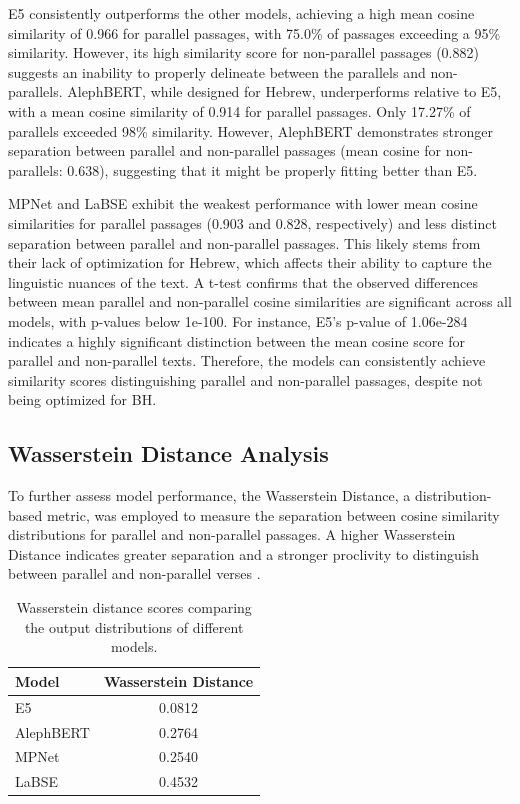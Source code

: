 \documentclass[12pt]{article}
\begin{document}
E5 consistently outperforms the other models, achieving a high mean cosine similarity of 0.966 for parallel passages, with 75.0\% of passages exceeding a 95\% similarity. However, its high similarity score for non-parallel passages (0.882) suggests an inability to properly delineate between the parallels and non-parallels. AlephBERT, while designed for Hebrew, underperforms relative to E5, with a mean cosine similarity of 0.914 for parallel passages. Only 17.27\% of parallels exceeded 98\% similarity. However, AlephBERT demonstrates stronger separation between parallel and non-parallel passages (mean cosine for non-parallels: 0.638), suggesting that it might be properly fitting better than E5.

MPNet and LaBSE exhibit the weakest performance with lower mean cosine similarities for parallel passages (0.903 and 0.828, respectively) and less distinct separation between parallel and non-parallel passages. This likely stems from their lack of optimization for Hebrew, which affects their ability to capture the linguistic nuances of the text.
A t-test confirms that the observed differences between mean parallel and non-parallel cosine similarities are significant across all models, with p-values below 1e-100. For instance, E5's p-value of 1.06e-284 indicates a highly significant distinction between the mean cosine score for parallel and non-parallel texts. Therefore, the models can consistently achieve similarity scores distinguishing parallel and non-parallel passages, despite not being optimized for BH.

\subsection{Wasserstein Distance Analysis}
To further assess model performance, the Wasserstein Distance, a distribution-based metric, was employed to measure the separation between cosine similarity distributions for parallel and non-parallel passages. A higher Wasserstein Distance indicates greater separation and a stronger proclivity to distinguish between parallel and non-parallel verses \cite{Leo}. 
\begin{table}[htbp]
\centering
\label{tab:wasserstein}
\begin{tabular}{@{}lc@{}}
\toprule
\textbf{Model} & \textbf{Wasserstein Distance} \\ 
\midrule
E5         & 0.0812 \\
AlephBERT  & 0.2764 \\
MPNet      & 0.2540 \\
LaBSE      & 0.4532 \\
\bottomrule
\end{tabular}
\caption{Wasserstein distance scores comparing the output distributions of different models.}
\end{table}
\end{document}
